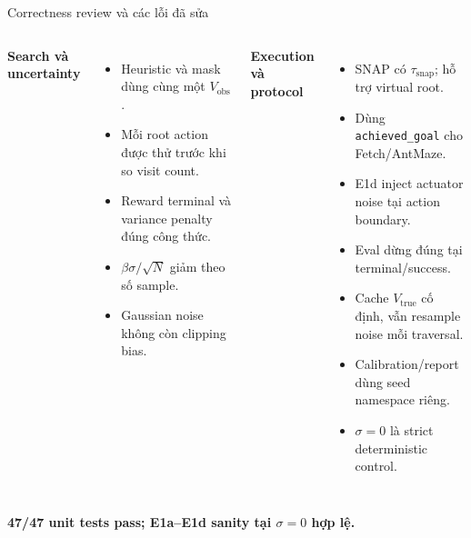 \documentclass[aspectratio=169,10pt]{beamer}
\newcommand{\code}[1]{\texttt{\small #1}}
\begin{document}
\begin{frame}{Correctness review và các lỗi đã sửa}
  \small
  \begin{columns}[T]
      \textbf{Search và uncertainty}
      \begin{itemize}
        \item Heuristic và mask dùng cùng một $V_{\mathrm{obs}}$.
        \item Mỗi root action được thử trước khi so visit count.
        \item Reward terminal và variance penalty đúng công thức.
        \item $\beta\sigma/\sqrt{N}$ giảm theo số sample.
        \item Gaussian noise không còn clipping bias.
      \end{itemize}
      \textbf{Execution và protocol}
      \begin{itemize}
        \item SNAP có $\tau_{\mathrm{snap}}$; hỗ trợ virtual root.
        \item Dùng \code{achieved\_goal} cho Fetch/AntMaze.
        \item E1d inject actuator noise tại action boundary.
        \item Eval dừng đúng tại terminal/success.
        \item Cache $V_{\mathrm{true}}$ cố định, vẫn resample noise mỗi traversal.
        \item Calibration/report dùng seed namespace riêng.
        \item $\sigma=0$ là strict deterministic control.
      \end{itemize}
  \end{columns}

  \vspace{0.4em}
  \centering
  \color{Success}\textbf{47/47 unit tests pass; E1a--E1d sanity tại $\sigma=0$ hợp lệ.}
\end{frame}
\end{document}
